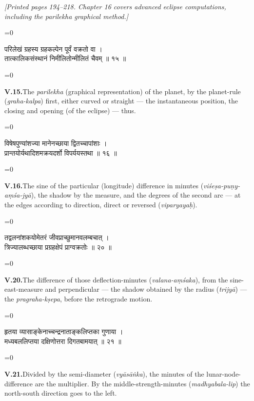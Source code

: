 \documentclass[11pt,a4paper]{article}
\newcommand{\cnote}[1]{\textcolor{notecolor}{\textit{#1}}}
\newcommand{\dev}[1]{{\devanagarifont\color{sktcolor}#1}}
\newcommand{\iast}[1]{\textit{#1}}
\newenvironment{paracol}[1]{\begingroup}{\endgroup}
\newcommand{\switchcolumn}[1][]{%
  \ifnum#1=0\relax\else\par\nobreak\vspace{0.5em}\par\nobreak\fi%
}
\begin{document}
\vspace{0.3cm}
\cnote{[Printed pages 194–218. Chapter 16 covers advanced eclipse
computations, including the \iast{parilekha} graphical method.]}
\vspace{0.3cm}

\begin{paracol}{2}
\switchcolumn[0]
\dev{%
परिलेखं ग्रहस्य ग्रहकल्पेन पूर्वं वक्रतो वा ।\\
तात्कालिकसंस्थानं निमीलितोन्मीलितं चैवम् ॥ १५ ॥
}

\switchcolumn[1]
\textbf{V.15.}\quad The \iast{parilekha} (graphical representation)
of the planet, by the planet-rule (\iast{graha-kalpa}) first, either
curved or straight — the instantaneous position, the closing and
opening (of the eclipse) — thus.
\end{paracol}

\vspace{0.3cm}

\begin{paracol}{2}
\switchcolumn[0]
\dev{%
विषेषपुण्यांशज्या मानेनच्छाया द्वितच्चापांशाः ।\\
प्रान्तयोर्यथादिशमक्रयदर्शो विपर्ययस्तथा ॥ १६ ॥
}

\switchcolumn[1]
\textbf{V.16.}\quad The sine of the particular (longitude)
difference in minutes (\iast{viśeṣa-puṇy-aṃśa-jyā}), the shadow by
the measure, and the degrees of the second arc — at the edges
according to direction, direct or reversed (\iast{viparyayaḥ}).
\end{paracol}

\vspace{0.3cm}

\begin{paracol}{2}
\switchcolumn[0]
\dev{%
तद्वलनांशकयोमेतरं जीवप्राच्छुमानवलम्बचात् ।\\
त्रिज्यालब्धच्छाया प्रग्रहक्षेपं प्राग्वक्रतोः ॥ २० ॥
}

\switchcolumn[1]
\textbf{V.20.}\quad The difference of those deflection-minutes
(\iast{valana-aṃśaka}), from the sine-east-measure and perpendicular
— the shadow obtained by the radius (\iast{trijyā}) — the
\iast{pragraha-kṣepa}, before the retrograde motion.
\end{paracol}

\vspace{0.3cm}

\begin{paracol}{2}
\switchcolumn[0]
\dev{%
हृतया व्यासाङ्केनाच्चन्द्रनाताङ्कलिप्तका गुणाया ।\\
मध्यबललिप्तया दक्षिणोत्तरा दिगतबामयात् ॥ २१ ॥
}

\switchcolumn[1]
\textbf{V.21.}\quad Divided by the semi-diameter
(\iast{vyāsāṅka}), the minutes of the lunar-node-difference are the
multiplier. By the middle-strength-minutes (\iast{madhyabala-lip})
the north-south direction goes to the left.
\end{paracol}
\end{document}
